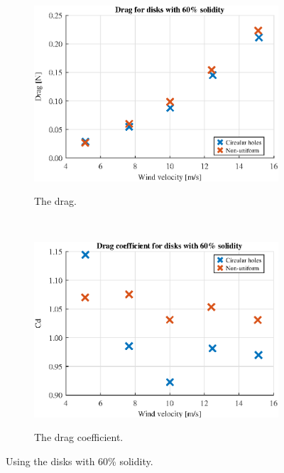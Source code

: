 \begin{figure} [h!]
    \centering
    \begin{subfigure}[b]{0.45\linewidth}
        \includegraphics[width=\textwidth]{0_Images/SixtyDrag.eps}
        \label{Fig:SixtyDrag}
        \caption{The drag.}
    \end{subfigure}
    ~
    \begin{subfigure}[b]{0.45\linewidth}
        \includegraphics[width=\textwidth]{0_Images/SixtyCD.eps}
        \label{Fig:SixtyCD}
        \caption{The drag coefficient.}
    \end{subfigure}
    \caption{Using the disks with 60\% solidity.}
    \label{fig:SixtyDisk}
\end{figure}


